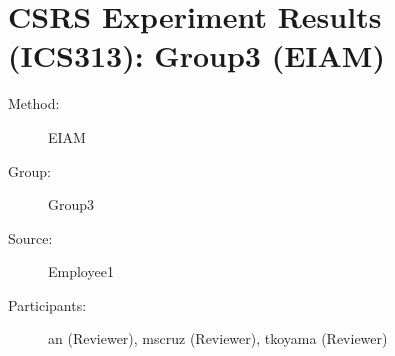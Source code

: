 
%          
\chapter {CSRS Experiment Results (ICS313): Group3 (EIAM)}
\small
	  

\begin{description}
\item [Method:] EIAM
\item [Group:] Group3
\item [Source:] Employee1
\item [Participants:] an (Reviewer), mscruz (Reviewer), tkoyama (Reviewer)
\end{description}
